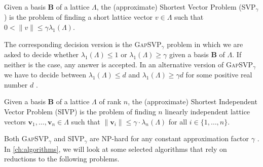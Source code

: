 \begin{definition} \label{def:svp}
    Given a basis $\mathbf{B}$ of a lattice $\Lambda$, the (approximate) Shortest Vector Problem (SVP$_\gamma$) is the problem of finding a short lattice vector $v\in \Lambda$ such that $0 < \| v \| \leq \gamma \lambda_1(\Lambda)$.
\end{definition}

The corresponding decision version is the \textsc{GapSVP}$_\gamma$ problem in which we are asked to decide whether $\lambda_1(\Lambda) \leq 1$ or $\lambda_1(\Lambda) \geq \gamma$ given a basis $\mathbf{B}$ of $\Lambda$. If neither is the case, any answer is accepted. In an alternative version of \textsc{GapSVP}$_\gamma$ we have to decide between $\lambda_1(\Lambda) \leq d$ and $\lambda_1(\Lambda) \geq \gamma d$ for some positive real number $d$ \cite{LM09}.

\begin{definition} \label{def:sivp}
    Given a basis $\mathbf{B}$ of a lattice $\Lambda$ of rank $n$, the (approximate) Shortest Independent Vector Problem (SIVP) is the problem of finding $n$ linearly independent lattice vectors $\mathbf{v}_1, \ldots, \mathbf{v}_n \in \Lambda$ such that $\|\mathbf{v}_i\| \leq \gamma \cdot \lambda_n(\Lambda)$ for all $i \in \{1, \ldots, n\}$.
\end{definition}

Both \textsc{GapSVP}$_\gamma$ and \textsc{SIVP}$_\gamma$ are NP-hard for any constant approximation factor $\gamma$ \cite{Khot05,BS99}. %
In \cref{ch:algorithms}, we will look at some selected algorithms that rely on reductions to the following problems.





